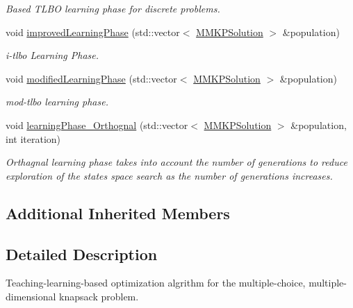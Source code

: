\begin{DoxyCompactItemize}
\begin{DoxyCompactList}\small\item\em Based T\+L\+B\+O learning phase for discrete problems. \end{DoxyCompactList}\item 
void \hyperlink{class_m_m_k_p___t_l_b_o_ae51a4d4fbd6b9cb6f20825ab706b4915}{improved\+Learning\+Phase} (std\+::vector$<$ \hyperlink{class_m_m_k_p_solution}{M\+M\+K\+P\+Solution} $>$ \&population)
\begin{DoxyCompactList}\small\item\em i-\/tlbo Learning Phase. \end{DoxyCompactList}\item 
void \hyperlink{class_m_m_k_p___t_l_b_o_abf2735af7c25800ba16a507623a14bcf}{modified\+Learning\+Phase} (std\+::vector$<$ \hyperlink{class_m_m_k_p_solution}{M\+M\+K\+P\+Solution} $>$ \&population)
\begin{DoxyCompactList}\small\item\em mod-\/tlbo learning phase. \end{DoxyCompactList}\item 
\hypertarget{class_m_m_k_p___t_l_b_o_ad79c49be3f52a25879df07ad70af65d8}{void \hyperlink{class_m_m_k_p___t_l_b_o_ad79c49be3f52a25879df07ad70af65d8}{learning\+Phase\+\_\+\+Orthognal} (std\+::vector$<$ \hyperlink{class_m_m_k_p_solution}{M\+M\+K\+P\+Solution} $>$ \&population, int iteration)}\label{class_m_m_k_p___t_l_b_o_ad79c49be3f52a25879df07ad70af65d8}

\begin{DoxyCompactList}\small\item\em Orthagnal learning phase takes into account the number of generations to reduce exploration of the states space search as the number of generations increases. \end{DoxyCompactList}\end{DoxyCompactItemize}
\subsection*{Additional Inherited Members}


\subsection{Detailed Description}
Teaching-\/learning-\/based optimization algrithm for the multiple-\/choice, multiple-\/dimensional knapsack problem. 

